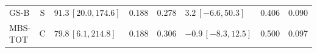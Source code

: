 \documentclass[10pt,a4paper]{article}
\begin{document}
\begin{longtable}{lcp{37mm}rrp{37mm}rr}
GS-B & S & \(91.3\,[20.0,174.6]\) & 0.188 & 0.278 & \(3.2\,[-6.6,50.3]\) & 0.406 & 0.090\\
MBS-TOT & C & \(79.8\,[6.1,214.8]\) & 0.188 & 0.306 & \(-0.9\,[-8.3,12.5]\) & 0.500 & 0.097\\

\end{longtable}
\end{document}
